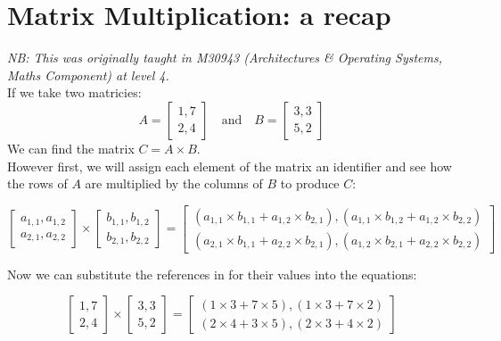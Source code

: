\section{Matrix Multiplication: a recap}
\textit{NB: This was originally taught in M30943 (Architectures \& Operating Systems, Maths Component) at level 4.}\\

If we take two matricies:
\begin{equation*}
    A = 
    \begin{bmatrix}
        1, 7\\
        2, 4
    \end{bmatrix}
    \quad \mathrm{and} \quad
    B = 
    \begin{bmatrix}
        3, 3\\
        5, 2
    \end{bmatrix}
\end{equation*}
We can find the matrix $C = A \times B$. \\

However first, we will assign each element of the matrix an identifier and see how the rows of $A$ are multiplied by the columns of $B$ to produce $C$:

\begin{equation*}
    \begin{bmatrix}
        a_{1,1}, a_{1,2}\\
        a_{2,1}, a_{2,2}
    \end{bmatrix}
    \times
    \begin{bmatrix}
        b_{1,1}, b_{1,2}\\
        b_{2,1}, b_{2,2}
    \end{bmatrix}
    = 
    \begin{bmatrix}
        (a_{1, 1} \times b_{1, 1} + a_{1, 2} \times b_{2, 1}), (a_{1, 1} \times b_{1, 2} + a_{1, 2} \times b_{2, 2})\\
        (a_{2, 1} \times b_{1, 1} + a_{2, 2} \times b_{2, 1}), (a_{1, 2} \times b_{2, 1} + a_{2, 2} \times b_{2, 2})
    \end{bmatrix}
\end{equation*}

Now we can substitute the references in for their values into the equations:

\begin{equation*}
    \begin{bmatrix}
        1, 7\\
        2, 4
    \end{bmatrix}
    \times
    \begin{bmatrix}
        3, 3\\
        5, 2
    \end{bmatrix}
    =
    \begin{bmatrix}
        (1 \times 3 + 7 \times 5), (1 \times 3 + 7 \times 2)\\ 
        (2 \times 4 + 3 \times 5), (2 \times 3 + 4 \times 2)
    \end{bmatrix}
\end{equation*}

